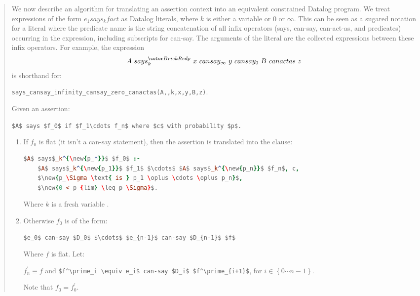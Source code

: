 \begin{quotation}
  \sffamily
  
We now describe an algorithm for translating an assertion context into
an equivalent constrained Datalog program. We treat expressions of the
form $e_1 says_k fact$ as Datalog literals, where $k$ is either a
variable or 0 or $\infty$. This can be seen as a sugared notation for
a literal where the predicate name is the string concatenation of all
infix operators (\textsf{says}, \textsf{can-say}, \textsf{can-act-as},
and predicates) occurring in the expression, including subscripts for
\textsf{can-say}. The arguments of the literal are the collected
expressions between these infix operators. For example, the expression
$$A~says_k^{\new{p}}~x~can say_\infty~y~can say_0~B~can act as~z$$
is shorthand for:
\begin{center}
\texttt{says\_cansay\_infinity\_cansay\_zero\_canactas(A,,k,x,y,B,z)}.
\end{center}

Given an assertion: 

\begin{center} \lstinline!$A$ says $f_0$ if $f_1\cdots f_n$ where $c$ with probability $p$.! \end{center}

\begin{enumerate}
\item 
  If $f_0$ is flat (it isn't a can-say statement), then the assertion is translated into the clause:
  \begin{lstlisting}[language=Prolog]
$A$ says$_k^{\new{p_*}}$ $f_0$ :- 
    $A$ says$_k^{\new{p_1}}$ $f_1$ $\cdots$ $A$ says$_k^{\new{p_n}}$ $f_n$, c, 
    $\new{p_\Sigma \text{ is } p_1 \oplus \cdots \oplus p_n}$, 
    $\new{0 < p_{lim} \leq p_\Sigma}$.
  \end{lstlisting}
  Where $k$ is a fresh variable .
  
\item 
  Otherwise $f_0$ is of the form:

  \lstinline!$e_0$ can-say $D_0$ $\cdots$ $e_{n-1}$ can-say $D_{n-1}$ $f$!

  Where $f$ is flat. Let:

  $f^\prime_n \equiv f$ and \lstinline!$f^\prime_i \equiv e_i$ can-say $D_i$ $f^\prime_{i+1}$!, for $i\in\left\{0\cdots n-1\right\}$.

  Note that $f_0 = f^\prime_0$.  


\end{enumerate}
\end{quotation}
